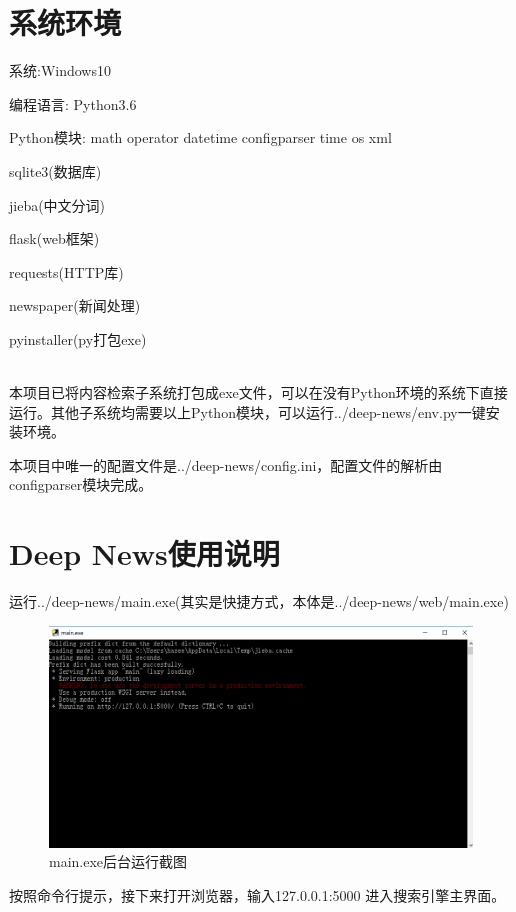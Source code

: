 \documentclass[12pt]{article}
\begin{document}
		\newpage
		
		\section{系统环境}
		
		系统:Windows10
		
		编程语言: Python3.6
		
		Python模块: math operator datetime configparser time os xml 
		
		sqlite3(数据库)
		
		jieba(中文分词)
		 
		flask(web框架)
		  
		requests(HTTP库) 
		
		newspaper(新闻处理)
		
		pyinstaller(py打包exe)
		
		~\\
		
		本项目已将内容检索子系统打包成exe文件，可以在没有Python环境的系统下直接运行。其他子系统均需要以上Python模块，可以运行../deep-news/env.py一键安装环境。
		
		本项目中唯一的配置文件是../deep-news/config.ini，配置文件的解析由configparser模块完成。
		
		\newpage
		
		\section{Deep News使用说明}
		
		运行../deep-news/main.exe(其实是快捷方式，本体是../deep-news/web/main.exe)
		
		\begin{figure}[htb]
			\centering
			\includegraphics[width=0.7\linewidth]{screenshot002}
			\caption[main.exe后台运行截图]{main.exe后台运行截图}
			\label{main.exe后台运行截图}
		\end{figure}
		
		按照命令行提示，接下来打开浏览器，输入127.0.0.1:5000 进入搜索引擎主界面。
		
\end{document}
